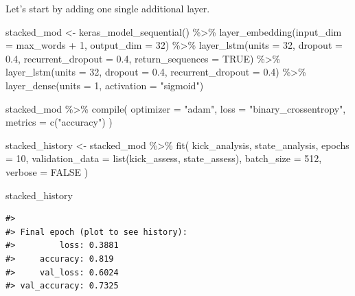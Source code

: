 \documentclass[
]{krantz}
\makeatletter
\newenvironment{Shaded}{\begin{snugshade}}{\end{snugshade}}
\newcommand{\AttributeTok}[1]{\textcolor[rgb]{0.77,0.63,0.00}{#1}}
\newcommand{\ConstantTok}[1]{\textcolor[rgb]{0.00,0.00,0.00}{#1}}
\newcommand{\DecValTok}[1]{\textcolor[rgb]{0.00,0.00,0.81}{#1}}
\newcommand{\FloatTok}[1]{\textcolor[rgb]{0.00,0.00,0.81}{#1}}
\newcommand{\FunctionTok}[1]{\textcolor[rgb]{0.00,0.00,0.00}{#1}}
\newcommand{\NormalTok}[1]{#1}
\newcommand{\OtherTok}[1]{\textcolor[rgb]{0.56,0.35,0.01}{#1}}
\newcommand{\SpecialCharTok}[1]{\textcolor[rgb]{0.00,0.00,0.00}{#1}}
\newcommand{\StringTok}[1]{\textcolor[rgb]{0.31,0.60,0.02}{#1}}
\newenvironment{kframe}{%
\medskip{}
\setlength{\fboxsep}{.8em}
 \def\at@end@of@kframe{}%
 \ifinner\ifhmode%
  \def\at@end@of@kframe{\end{minipage}}%
  \begin{minipage}{\columnwidth}%
 \fi\fi%
 \def\FrameCommand##1{\hskip\@totalleftmargin \hskip-\fboxsep
 \colorbox{shadecolor}{##1}\hskip-\fboxsep
     \hskip-\linewidth \hskip-\@totalleftmargin \hskip\columnwidth}%
 \MakeFramed {\advance\hsize-\width
   \@totalleftmargin\z@ \linewidth\hsize
   \@setminipage}}%
 {\par\unskip\endMakeFramed%
 \at@end@of@kframe}
\renewenvironment{Shaded}{\begin{kframe}}{\end{kframe}}
\makeatother
\begin{document}
Let's start by adding one single additional layer.

\begin{Shaded}
\begin{Highlighting}[]
\NormalTok{stacked\_mod }\OtherTok{\textless{}{-}} \FunctionTok{keras\_model\_sequential}\NormalTok{() }\SpecialCharTok{\%\textgreater{}\%}
  \FunctionTok{layer\_embedding}\NormalTok{(}\AttributeTok{input\_dim =}\NormalTok{ max\_words }\SpecialCharTok{+} \DecValTok{1}\NormalTok{, }\AttributeTok{output\_dim =} \DecValTok{32}\NormalTok{) }\SpecialCharTok{\%\textgreater{}\%}
  \FunctionTok{layer\_lstm}\NormalTok{(}\AttributeTok{units =} \DecValTok{32}\NormalTok{, }\AttributeTok{dropout =} \FloatTok{0.4}\NormalTok{, }\AttributeTok{recurrent\_dropout =} \FloatTok{0.4}\NormalTok{,}
             \AttributeTok{return\_sequences =} \ConstantTok{TRUE}\NormalTok{) }\SpecialCharTok{\%\textgreater{}\%}
  \FunctionTok{layer\_lstm}\NormalTok{(}\AttributeTok{units =} \DecValTok{32}\NormalTok{, }\AttributeTok{dropout =} \FloatTok{0.4}\NormalTok{, }\AttributeTok{recurrent\_dropout =} \FloatTok{0.4}\NormalTok{) }\SpecialCharTok{\%\textgreater{}\%}
  \FunctionTok{layer\_dense}\NormalTok{(}\AttributeTok{units =} \DecValTok{1}\NormalTok{, }\AttributeTok{activation =} \StringTok{"sigmoid"}\NormalTok{)}

\NormalTok{stacked\_mod }\SpecialCharTok{\%\textgreater{}\%}
  \FunctionTok{compile}\NormalTok{(}
    \AttributeTok{optimizer =} \StringTok{"adam"}\NormalTok{,}
    \AttributeTok{loss =} \StringTok{"binary\_crossentropy"}\NormalTok{,}
    \AttributeTok{metrics =} \FunctionTok{c}\NormalTok{(}\StringTok{"accuracy"}\NormalTok{)}
\NormalTok{  )}

\NormalTok{stacked\_history }\OtherTok{\textless{}{-}}\NormalTok{ stacked\_mod }\SpecialCharTok{\%\textgreater{}\%}
  \FunctionTok{fit}\NormalTok{(}
\NormalTok{    kick\_analysis,}
\NormalTok{    state\_analysis,}
    \AttributeTok{epochs =} \DecValTok{10}\NormalTok{,}
    \AttributeTok{validation\_data =} \FunctionTok{list}\NormalTok{(kick\_assess, state\_assess),}
    \AttributeTok{batch\_size =} \DecValTok{512}\NormalTok{,}
    \AttributeTok{verbose =} \ConstantTok{FALSE}
\NormalTok{  )}

\NormalTok{stacked\_history}
\end{Highlighting}
\end{Shaded}

\begin{verbatim}
#> 
#> Final epoch (plot to see history):
#>         loss: 0.3881
#>     accuracy: 0.819
#>     val_loss: 0.6024
#> val_accuracy: 0.7325
\end{verbatim}
\end{document}
